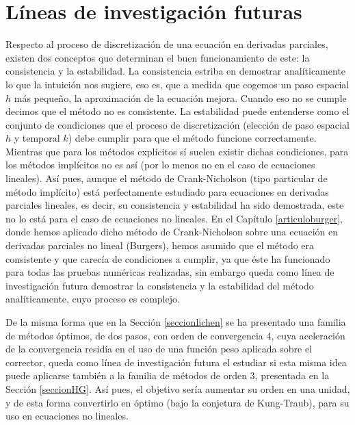 
\chapter{Líneas de investigación futuras}

Respecto al proceso de discretización de una ecuación en derivadas parciales, existen dos conceptos que determinan el buen funcionamiento de este: la consistencia y la estabilidad. La consistencia estriba en demostrar analíticamente lo que la intuición nos sugiere, eso es, que a medida que cogemos un paso espacial $h$ más pequeño, la aproximación de la ecuación mejora. Cuando eso no se cumple decimos que el método no es consistente. La estabilidad puede entenderse como el conjunto de condiciones que el proceso de discretización (elección de paso espacial $h$ y temporal $k$) debe cumplir para que el método funcione correctamente. Mientras que para los métodos explícitos sí suelen existir dichas condiciones, para los métodos implícitos no es así (por lo menos no en el caso de ecuaciones lineales). Así pues, aunque el método de Crank-Nicholson (tipo particular de método implícito) está perfectamente estudiado para ecuaciones en derivadas parciales lineales, es decir, su consistencia y estabilidad ha sido demostrada, este no lo está para el caso de ecuaciones no lineales. En el Capítulo \ref{articuloburger}, donde hemos aplicado dicho método de Crank-Nicholson sobre una ecuación en derivadas parciales no lineal (Burgers), hemos asumido que el método era consistente y que carecía de condiciones a cumplir, ya que éste ha funcionado para todas las pruebas numéricas realizadas, sin embargo queda como línea de investigación futura demostrar la consistencia y la estabilidad del método analíticamente, cuyo proceso es complejo.

De la misma forma que en la Sección \ref{seccionlichen} se ha presentado una familia de métodos óptimos, de dos pasos, con orden de convergencia 4, cuya aceleración de la convergencia residía en el uso de una función peso aplicada sobre el corrector, queda como línea de investigación futura el estudiar si esta misma idea puede aplicarse también a la familia de métodos de orden 3, presentada en la Sección \ref{seccionHG}. Así pues, el objetivo sería aumentar su orden en una unidad, y de esta forma convertirlo en óptimo (bajo la conjetura de Kung-Traub), para su uso en ecuaciones no lineales.

